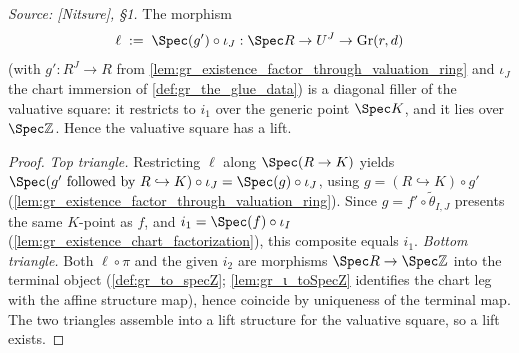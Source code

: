 \begin{lemma}

  \label{lem:gr_existence_lift}
  \textit{Source: [Nitsure], \S 1.}
  The morphism
  \[
    \ell \;:=\; \Spec(g') \circ \iota_J : \Spec R \to U^J \to \mathrm{Gr}(r,d)
  \]
  (with \(g' : R^J \to R\) from
  \cref{lem:gr_existence_factor_through_valuation_ring} and \(\iota_J\) the chart
  immersion of \cref{def:gr_the_glue_data}) is a diagonal filler of the valuative
  square: it restricts to \(i_1\) over the generic point \(\Spec K\), and it lies
  over \(\Spec \mathbb{Z}\). Hence the valuative square has a lift.
\end{lemma}
\begin{proof}
    \leanok
  \emph{Top triangle.} Restricting \(\ell\) along \(\Spec(R \to K)\) yields
  \(\Spec(g' \text{ followed by } R \hookrightarrow K) \circ \iota_J = \Spec(g)
  \circ \iota_J\), using \(g = (R \hookrightarrow K)\circ g'\)
  (\cref{lem:gr_existence_factor_through_valuation_ring}). Since \(g = f' \circ
  \tilde\theta_{I,J}\) presents the same \(K\)-point as \(f\), and \(i_1 = \Spec(f)
  \circ \iota_I\) (\cref{lem:gr_existence_chart_factorization}), this composite
  equals \(i_1\). \emph{Bottom triangle.} Both \(\ell \circ \pi\) and the given
  \(i_2\) are morphisms \(\Spec R \to \Spec \mathbb{Z}\) into the terminal object
  (\cref{def:gr_to_specZ}; \cref{lem:gr_ι_toSpecZ} identifies the chart leg with the
  affine structure map), hence coincide by uniqueness of the terminal map. The two
  triangles assemble into a lift structure for the valuative square, so a lift
  exists.
\end{proof}

